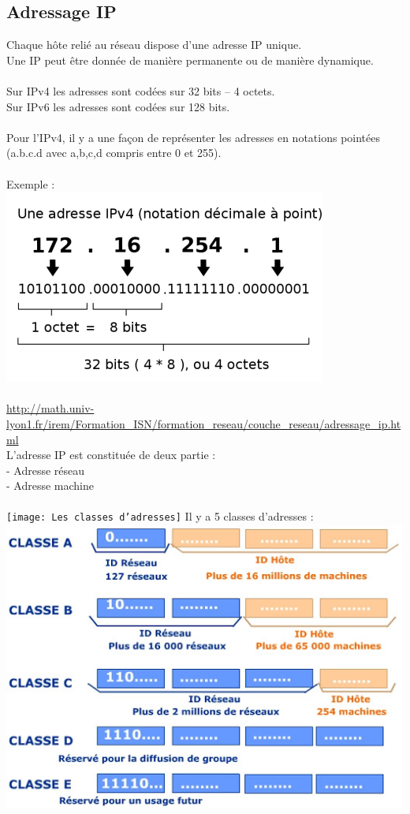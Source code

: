 \documentclass{article}
\begin{document}
\subsection{Adressage IP}
Chaque hôte relié au réseau dispose d’une adresse IP unique. \\
Une IP peut être donnée de manière permanente ou de manière dynamique. \\ 
\\
Sur IPv4 les adresses sont codées sur 32 bits – 4 octets. \\
Sur IPv6 les adresses sont codées sur 128 bits. \\
\\
Pour l'IPv4, il y a une façon de représenter les adresses en notations pointées (a.b.c.d avec a,b,c,d compris entre 0 et 255). \\
\\
\newpage
Exemple : \\
\includegraphics{IPv4.png} \\
\\
\url{http://math.univ-lyon1.fr/irem/Formation_ISN/formation_reseau/couche_reseau/adressage_ip.html}
\\
\newpage
L’adresse IP est constituée de deux partie : \\
- Adresse réseau \\
- Adresse machine \\
\\
\texttt{[image: Les classes d'adresses]}
Il y a 5 classes d’adresses : \\
\includegraphics{classesIP.jpg} \\
\end{document}

